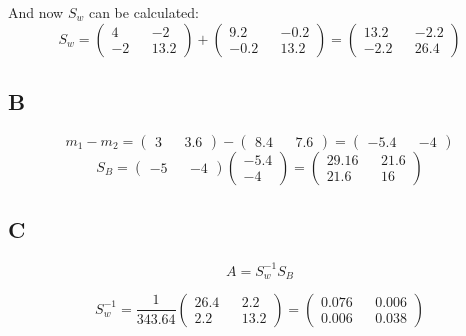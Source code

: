 \documentclass{article}
\begin{document}
And now $S_w$ can be calculated:
\begin{equation*}
    S_w = \begin{pmatrix}
        4 && -2 \\ -2 && 13.2
    \end{pmatrix} + \begin{pmatrix}
        9.2 && -0.2\\-0.2&&13.2
    \end{pmatrix} = \begin{pmatrix}
        13.2 && -2.2 \\ -2.2 && 26.4
    \end{pmatrix}
\end{equation*}

\subsection*{B}
\begin{equation*}
    m_1 - m_2 = \begin{pmatrix}
        3 && 3.6
    \end{pmatrix} - \begin{pmatrix}
        8.4 && 7.6
    \end{pmatrix} = \begin{pmatrix}
        -5.4 && -4
    \end{pmatrix}
\end{equation*}
\begin{equation*}
    S_B = \begin{pmatrix}
        -5 && -4    
    \end{pmatrix} \begin{pmatrix}
        -5.4\\-4
    \end{pmatrix} = \begin{pmatrix}
        29.16 && 21.6\\
        21.6 && 16
    \end{pmatrix}
\end{equation*}

\subsection*{C}
\begin{equation*}
    A = S_w^{-1}S_B
\end{equation*}

\begin{equation*}
    S_w^{-1} = \frac{1}{343.64} \begin{pmatrix}
        26.4 && 2.2 \\ 2.2 && 13.2
    \end{pmatrix} = \begin{pmatrix}
        0.076 && 0.006 \\ 0.006 && 0.038
    \end{pmatrix}
\end{equation*}
\end{document}
